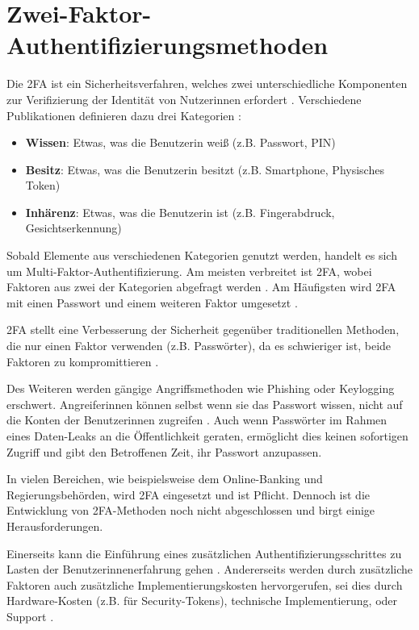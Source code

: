 \chapter{Zwei-Faktor-Authentifizierungsmethoden}
Die \ac{2FA} ist ein Sicherheitsverfahren, welches zwei unterschiedliche Komponenten zur Verifizierung der Identität von Nutzerinnen erfordert \parencite{decristofaroComparativeUsability2014}. Verschiedene Publikationen definieren dazu drei Kategorien \parencite{decristofaroComparativeUsability2014, yuEfficientGeneric2014, singhMultifactorAuthentication2017}:
\begin{itemize}
  \item \textbf{Wissen}: Etwas, was die Benutzerin weiß (z.B. Passwort, PIN)
  \item \textbf{Besitz}: Etwas, was die Benutzerin besitzt (z.B. Smartphone, Physisches Token)
  \item \textbf{Inhärenz}: Etwas, was die Benutzerin ist (z.B. Fingerabdruck, Gesichtserkennung)
\end{itemize}
Sobald Elemente aus verschiedenen Kategorien genutzt werden, handelt es sich um Multi-Faktor-Authentifizierung. Am meisten verbreitet ist \ac{2FA}, wobei Faktoren aus zwei der Kategorien abgefragt werden \parencite{decristofaroComparativeUsability2014}. Am Häufigsten wird \ac{2FA} mit einen Passwort und einem weiteren Faktor umgesetzt \parencite{decristofaroComparativeUsability2014}.

\pskip
\ac{2FA} stellt eine Verbesserung der Sicherheit gegenüber traditionellen Methoden, die nur einen Faktor verwenden (z.B. Passwörter), da es schwieriger ist, beide Faktoren zu kompromittieren \parencite{dasguptaMultiFactorAuthentication2017}.

Des Weiteren werden gängige Angriffsmethoden wie Phishing oder Keylogging erschwert. Angreiferinnen können selbst wenn sie das Passwort wissen, nicht auf die Konten der Benutzerinnen zugreifen \parencite{dasguptaMultiFactorAuthentication2017}. Auch wenn Passwörter im Rahmen eines Daten-Leaks an die Öffentlichkeit geraten, ermöglicht dies keinen sofortigen Zugriff und gibt den Betroffenen Zeit, ihr Passwort anzupassen.

\pskip
In vielen Bereichen, wie beispielsweise dem Online-Banking und Regierungsbehörden, wird \ac{2FA} eingesetzt und ist Pflicht. Dennoch ist die Entwicklung von \ac{2FA}-Methoden noch nicht abgeschlossen und birgt einige Herausforderungen.

Einerseits kann die Einführung eines zusätzlichen Authentifizierungsschrittes zu Lasten der Benutzerinnenerfahrung gehen \parencite{decristofaroComparativeUsability2014}. Andererseits werden durch zusätzliche Faktoren auch zusätzliche Implementierungskosten hervorgerufen, sei dies durch Hardware-Kosten (z.B. für Security-Tokens), technische Implementierung, oder Support \parencite{alsaleemMultiFactorAuthentication2021}.


